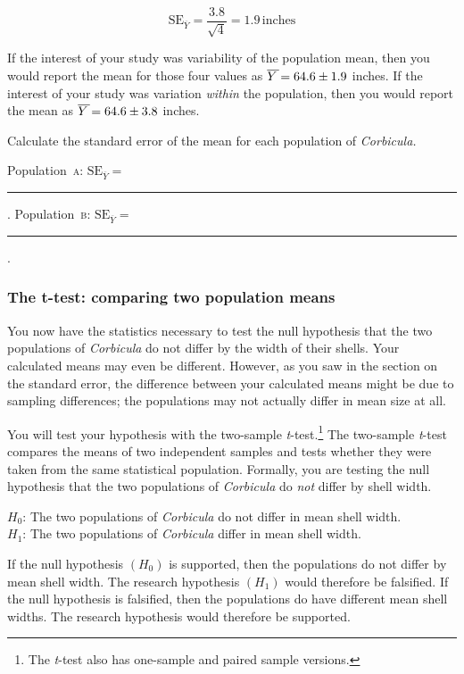 \documentclass[12pt]{exam}
\newcommand*\meanY{\overline{Y\kern1.67pt}\kern-1.67pt}
\newcommand*\meansubY{\overline{Y}}
\newcommand*\ttest{\emph{t}-test}
\newcommand*\Popa{Population~\textsc{a}}
\newcommand*\Popb{Population~\textsc{b}}
\newcommand*\Corbicula{\textit{Corbicula}}
\newcommand*\AnswerBlank{\rule{0.75in}{0.4pt}\kern0.67pt.}
\begin{document}
\begin{questions}
\[	\mathrm{SE}_{\meansubY} = \frac{3.8}{\sqrt{4}} = 1.9\,\mathrm{inches} \]

If the interest of your study was variability of the population mean, then you would report the mean for those four values as $\meanY = 64.6 \pm 1.9$ inches. If the interest of your study was variation \emph{within} the population, then you would report the mean as $\meanY = 64.6 \pm 3.8$ inches. 

\question
Calculate the standard error of the mean for each population of \textit{Corbicula.}

\bigskip

\Popa{}: $\mathrm{SE}_{\meansubY} =$  \AnswerBlank{} \qquad 
\Popb{}: $\mathrm{SE}_{\meansubY} =$  \AnswerBlank{}


\subsubsection*{The t-test: comparing two population means}

You now have the statistics necessary to test the null hypothesis that the two populations of \Corbicula{} do not differ by the width of their shells. Your calculated means may even be different. However, as you saw in the section on the standard error, the difference between your calculated means might be due to sampling differences; the populations may not actually differ in mean size at all.

You will test your hypothesis with the two-sample \ttest{}.\footnote{The \ttest{} also has one-sample and paired sample versions.} The two-sample \ttest{} compares the means of two independent samples and tests whether they were taken from the same statistical population. Formally, you are testing the null hypothesis that the two populations of \Corbicula{} do \emph{not} differ by shell width. 

\hspace*{1em} $H_0$: The two populations of \Corbicula{} do not differ in mean shell width.\\
\hspace*{1em} $H_1$: The two populations of \Corbicula{} differ in mean shell width.

If the null hypothesis $\left(H_0\right)$ is supported, then the populations do not differ by mean shell width. The research hypothesis $\left(H_1\right)$ would therefore be falsified. If the null hypothesis is falsified, then the populations do have different mean shell widths. The research hypothesis would therefore be supported.


\end{questions}
\end{document}
